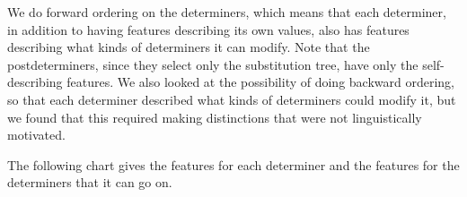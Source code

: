 
We do forward ordering on the determiners, which means that each determiner, in
addition to having features describing its own values, also has features
describing what kinds of determiners it can modify.  Note that the
postdeterminers, since they select only the substitution tree, have only the
self-describing features.  We also looked at the possibility of doing
backward ordering, so that each determiner described what kinds of determiners
could modify it, but we found that this required making distinctions that were
not linguistically motivated.

The following chart gives the features for each determiner and the features for
the determiners that it can go on.


